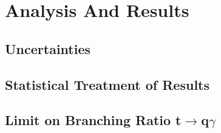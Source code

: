 
\chapter{Analysis And Results}
\label{ch:Results}
\section{Uncertainties}
\section{Statistical Treatment of Results}
\section{Limit on Branching Ratio t$\rightarrow$q$\gamma$}



